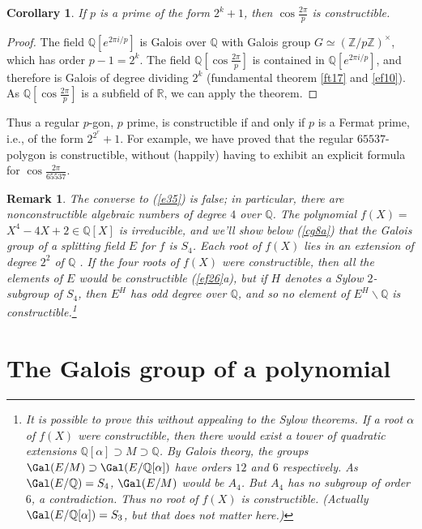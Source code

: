 \documentclass[a4paper,11pt,final,openany]{memoir}
\newtheorem{corollary}[X]{Corollary}
\newtheorem{remark}[X]{Remark}
\theoremstyle{nonumberplain}
\newtheorem{proof}{Proof.}
\begin{document}
\begin{corollary}
\label{ft24}If $p$ is a prime of the form $2^{k}+1$, then $\cos\frac{2\pi}{p}$
is constructible.
\end{corollary}

\begin{proof}
The field $\mathbb{Q}[e^{2\pi i/p}]$ is Galois over $\mathbb{Q}$ with Galois
group $G\simeq(\mathbb{Z}/p\mathbb{Z})^{\times}$, which has order $p-1=2^{k}$.
The field $\mathbb{Q}{}[\cos\frac{2\pi}{p}]$ is contained in $\mathbb{Q}%
[e^{2\pi i/p}]$, and therefore is Galois of degree dividing $2^{k}$
(fundamental theorem \ref{ft17} and \ref{ef10}). As $\mathbb{Q}{}[\cos
\frac{2\pi}{p}]$ is a subfield of $\mathbb{R}{}$, we can apply the theorem.
\end{proof}

Thus a regular $p$-gon, $p$ prime, is constructible if and only if $p$ is a
Fermat prime, i.e., of the form $2^{2^{r}}+1$. For example, we have proved
that the regular $65537$-polygon is constructible, without (happily) having to
exhibit an explicit formula for $\cos\frac{2\pi}{65537}$.

\begin{remark}
\label{ft23r}The converse to (\ref{e35}) is false; in particular, there are
nonconstructible algebraic numbers of degree $4$ over $\mathbb{Q}{}$. The
polynomial $f(X)=$ $X^{4}-4X+2\in\mathbb{Q}{}[X]$ is irreducible, and we'll
show below (\ref{cg8a}) that the Galois group of a splitting field $E{}$ for
$f$ is $S_{4}$. Each root of $f(X)$ lies in an extension of degree $2^{2}$ of
$\mathbb{Q}{}$ . If the four roots of $f(X)$ were constructible, then all the
elements of $E$ would be constructible (\ref{ef26}a), but if $H$ denotes a
Sylow $2$-subgroup of $S_{4}$, then $E^{H}$ has odd degree over $\mathbb{Q}{}%
$, and so no element of $E^{H}\smallsetminus\mathbb{Q}{}$ is
constructible.\footnote{It is possible to prove this without appealing to the
Sylow theorems. If a root $\alpha$ of $f(X)$ were constructible, then there
would exist a tower of quadratic extensions $\mathbb{Q}[\alpha]\supset
M\supset\mathbb{Q}$. By Galois theory, the groups $\Gal(E/M)\supset
\Gal(E/\mathbb{Q}[\alpha])$ have orders $12$ and $6$ respectively. As
$\Gal(E/\mathbb{Q})=S_{4}$, $\Gal(E/M)$ would be $A_{4}$. But $A_{4}$ has no
subgroup of order $6$, a contradiction. Thus no root of $f(X)$ is
constructible. (Actually $\Gal(E/\mathbb{Q}[\alpha])=S_{3}$, but that does not
matter here.)}
\end{remark}

\section{The Galois group of a polynomial}
\end{document}
